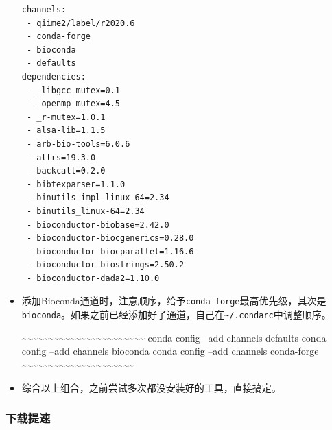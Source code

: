 \documentclass[]{article}
\numberwithin{figure}{section}
\numberwithin{table}{section}
\begin{document}
\begin{itemize}
\begin{verbatim}
channels:
 - qiime2/label/r2020.6
 - conda-forge
 - bioconda
 - defaults
dependencies:
 - _libgcc_mutex=0.1
 - _openmp_mutex=4.5
 - _r-mutex=1.0.1
 - alsa-lib=1.1.5
 - arb-bio-tools=6.0.6
 - attrs=19.3.0
 - backcall=0.2.0
 - bibtexparser=1.1.0
 - binutils_impl_linux-64=2.34
 - binutils_linux-64=2.34
 - bioconductor-biobase=2.42.0
 - bioconductor-biocgenerics=0.28.0
 - bioconductor-biocparallel=1.16.6
 - bioconductor-biostrings=2.50.2
 - bioconductor-dada2=1.10.0
\end{verbatim}
\item
  添加Bioconda通道时，注意顺序，给予\texttt{conda-forge}最高优先级，其次是\texttt{bioconda}。如果之前已经添加好了通道，自己在\texttt{\textasciitilde{}/.condarc}中调整顺序。

  \textasciitilde\textasciitilde\textasciitilde\textasciitilde\textasciitilde\textasciitilde\textasciitilde\textasciitilde\textasciitilde\textasciitilde\textasciitilde\textasciitilde\textasciitilde\textasciitilde\textasciitilde\textasciitilde\textasciitilde\textasciitilde\textasciitilde\textasciitilde\textasciitilde\textasciitilde\textasciitilde{}
  conda config --add channels defaults
  conda config --add channels bioconda
  conda config --add channels conda-forge
  \textasciitilde\textasciitilde\textasciitilde\textasciitilde\textasciitilde\textasciitilde\textasciitilde\textasciitilde\textasciitilde\textasciitilde\textasciitilde\textasciitilde\textasciitilde\textasciitilde\textasciitilde\textasciitilde\textasciitilde\textasciitilde\textasciitilde\textasciitilde\textasciitilde{}
\item
  综合以上组合，之前尝试多次都没安装好的工具，直接搞定。
\end{itemize}

\hypertarget{conda_downlaod_fast}{%
\subsubsection{下载提速}\label{conda_downlaod_fast}}
\end{document}

